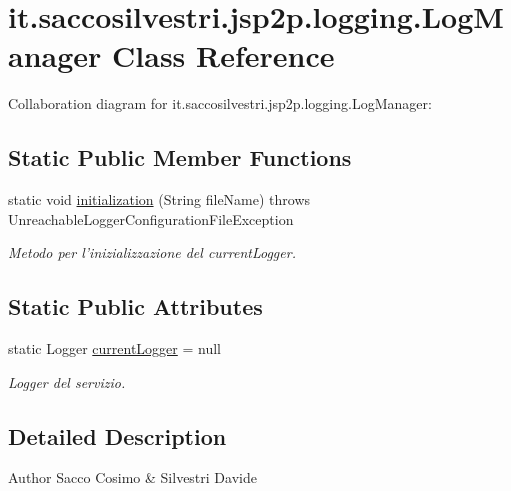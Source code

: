 \hypertarget{classit_1_1saccosilvestri_1_1jsp2p_1_1logging_1_1_log_manager}{
\section{it.saccosilvestri.jsp2p.logging.\-Log\-Manager \-Class \-Reference}
\label{classit_1_1saccosilvestri_1_1jsp2p_1_1logging_1_1_log_manager}
}


\-Collaboration diagram for it.saccosilvestri.jsp2p.logging.\-Log\-Manager\-:
\subsection*{\-Static \-Public \-Member \-Functions}
\begin{DoxyCompactItemize}
\item 
static void \hyperlink{classit_1_1saccosilvestri_1_1jsp2p_1_1logging_1_1_log_manager_ad7278339415e5078870cff4342c4f2d0}{initialization} (\-String file\-Name)  throws Unreachable\-Logger\-Configuration\-File\-Exception 
\begin{DoxyCompactList}\small\item\em \-Metodo per l'inizializzazione del current\-Logger. \end{DoxyCompactList}\end{DoxyCompactItemize}
\subsection*{\-Static \-Public \-Attributes}
\begin{DoxyCompactItemize}
\item 
static \-Logger \hyperlink{classit_1_1saccosilvestri_1_1jsp2p_1_1logging_1_1_log_manager_ac534c0785d97731f02293b165c9e0bd7}{current\-Logger} = null
\begin{DoxyCompactList}\small\item\em \-Logger del servizio. \end{DoxyCompactList}\end{DoxyCompactItemize}


\subsection{\-Detailed \-Description}
\begin{DoxyAuthor}{\-Author}
\-Sacco \-Cosimo \& \-Silvestri \-Davide 
\end{DoxyAuthor}



